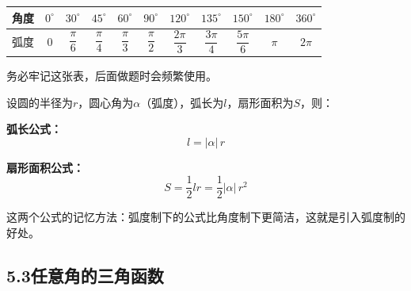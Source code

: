 \documentclass[12pt, a4paper]{ctexart}
\begin{document}
\begin{tipbox}[常见角度的弧度与角度对照]
\begin{center}
\begin{tabular}{ccccccccccc}
\toprule
角度 & $0^\circ$ & $30^\circ$ & $45^\circ$ & $60^\circ$ & $90^\circ$ & $120^\circ$ & $135^\circ$ & $150^\circ$ & $180^\circ$ & $360^\circ$ \\
\midrule
弧度 & $0$ & $\dfrac{\pi}{6}$ & $\dfrac{\pi}{4}$ & $\dfrac{\pi}{3}$ & $\dfrac{\pi}{2}$ & $\dfrac{2\pi}{3}$ & $\dfrac{3\pi}{4}$ & $\dfrac{5\pi}{6}$ & $\pi$ & $2\pi$ \\
\bottomrule
\end{tabular}
\end{center}
务必牢记这张表，后面做题时会频繁使用。
\end{tipbox}

\begin{knowledgebox}[弧长公式与扇形面积]
设圆的半径为$r$，圆心角为$\alpha$（弧度），弧长为$l$，扇形面积为$S$，则：

\medskip
\textbf{弧长公式：}
\[
  \boxed{l=|\alpha|\,r}
\]

\textbf{扇形面积公式：}
\[
  \boxed{S=\frac{1}{2}lr=\frac{1}{2}|\alpha|\,r^2}
\]

这两个公式的记忆方法：弧度制下的公式比角度制下更简洁，这就是引入弧度制的好处。
\end{knowledgebox}

\subsection*{5.3\quad 任意角的三角函数}
\end{document}

